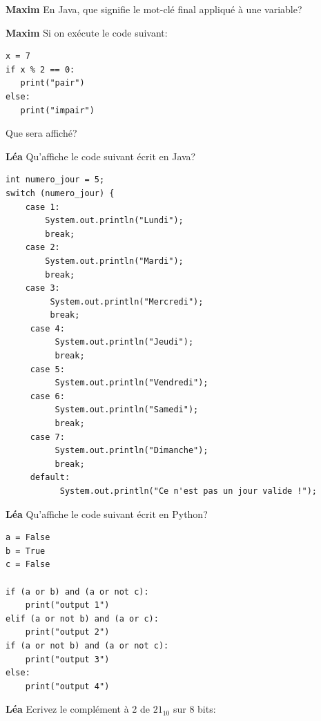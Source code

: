 \begin{Exercice}[10 minutes]\textbf{Maxim}
En Java, que signifie le mot-clé final appliqué à une variable?

\end{Exercice}

\begin{Exercice}[10 minutes]\textbf{Maxim}
Si on exécute le code suivant:

\begin{lstlisting}[style=pythonstyle]
x = 7 
if x % 2 == 0: 
   print("pair") 
else: 
   print("impair") 
\end{lstlisting}
Que sera affiché?

\end{Exercice}

\begin{Exercice}[10 minutes]\textbf{Léa}
Qu'affiche le code suivant écrit en Java?

\begin{lstlisting}[style=javastyle]
int numero_jour = 5;
switch (numero_jour) {
    case 1:                
        System.out.println("Lundi");
        break;
    case 2:
        System.out.println("Mardi");
        break;
    case 3:
         System.out.println("Mercredi");
         break;
     case 4:
          System.out.println("Jeudi");
          break;            
     case 5:                
          System.out.println("Vendredi");
     case 6:                
          System.out.println("Samedi");
          break;            
     case 7:                
          System.out.println("Dimanche");
          break;            
     default:                
           System.out.println("Ce n'est pas un jour valide !");
\end{lstlisting}

\end{Exercice}

\begin{Exercice}[10 minutes]\textbf{Léa}
Qu'affiche le code suivant écrit en Python?
\begin{lstlisting}[style=pythonstyle]
a = False
b = True
c = False

if (a or b) and (a or not c):
    print("output 1")
elif (a or not b) and (a or c):
    print("output 2")
if (a or not b) and (a or not c):
    print("output 3")
else:
    print("output 4")
\end{lstlisting}
\end{Exercice}

\begin{Exercice}[10 minutes]\textbf{Léa}
Ecrivez le complément à 2 de $21_{10}$ sur 8 bits:
\end{Exercice}


